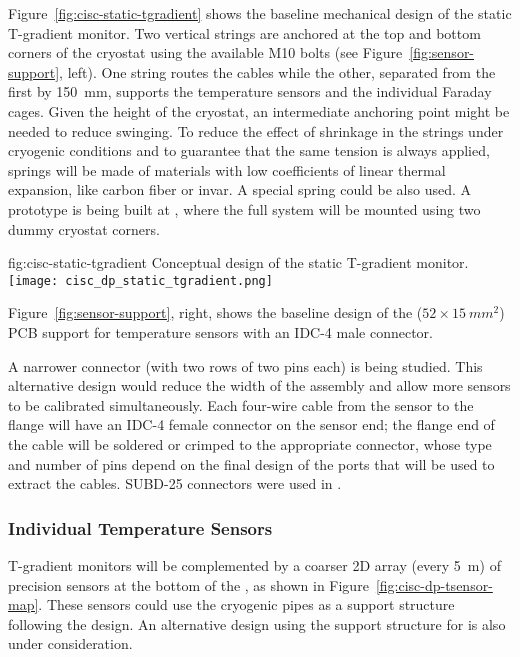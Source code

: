 Figure~\ref{fig:cisc-static-tgradient} shows the baseline mechanical design of
the static T-gradient monitor. Two vertical strings are anchored at the top and bottom corners of the cryostat
using the available M10 bolts (see Figure~\ref{fig:sensor-support}, left). One string routes the cables while the other,
separated from the first by \SI{150}{mm},  supports the temperature sensors and the individual Faraday cages. 
Given the height of the cryostat, an intermediate anchoring point might be needed to reduce swinging. To reduce the effect of shrinkage in the strings under cryogenic conditions and to guarantee that the same tension is always applied, springs will be made of materials with low coefficients of linear thermal expansion, like carbon fiber or invar. A special spring could be also used. A prototype is being built at , where the full system will be mounted using two dummy cryostat corners.  
\begin{dunefigure}
{fig:cisc-static-tgradient}
  {Conceptual design of the static T-gradient monitor.}
  \texttt{[image: cisc\_dp\_static\_tgradient.png]}
\end{dunefigure}


Figure~\ref{fig:sensor-support}, right, shows the baseline design of the ($52\times \SI{15}{mm^2}$) 
PCB support for temperature sensors with an IDC-4 male connector. %

A narrower connector (with two rows of two pins each) is being studied. This alternative design would reduce the width of the  assembly and allow more sensors to be calibrated simultaneously. Each four-wire cable from the sensor to the flange will have an IDC-4 female connector on the sensor end; the flange end of the cable will be soldered or crimped to the appropriate connector, whose type and number of pins  depend on the final design of the  ports that will be used to extract the cables. SUBD-25 connectors were used in .


\subsubsection{Individual Temperature Sensors}
\label{sec:fdgen-slow-cryo-individual-therm}

T-gradient monitors will be complemented by a coarser 2D array (every \SI{5}{m}) of precision sensors at the bottom of the , as shown in Figure~\ref{fig:cisc-dp-tsensor-map}. These sensors could  use the cryogenic pipes as a support structure following the  design. An alternative design using the support structure for  is also under consideration.  

